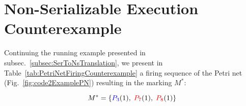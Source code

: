 
\section{Non-Serializable Execution Counterexample}
\label{appendix:non-serializable-execution-example}
Continuing the running example presented in subsec.~\ref{subsec:SerToNsTranslation}, we present in Table~\ref{tab:PetriNetFiringCounterexample} a firing sequence of the Petri net (Fig.~\ref{fig:code2ExamplePN}) resulting in the marking \(M^*\):

\[
M^* = \{\textcolor{blue}{P_3}(1),\;\textcolor{red}{P_7}(1),\;\textcolor{red}{P_8}(1)\}
\]
%
%
%

%
%
%
%
%


